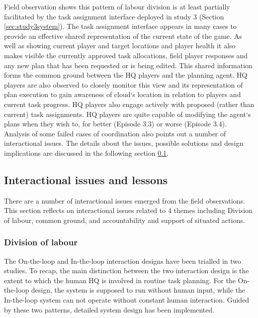 Field observation shows this pattern of labour division is at least partially facilitated by the task assignment interface deployed in study 3 (Section \ref{sec:study3system}). The task assignment interface appears in many cases to provide an effective shared representation of the current state of the game. As well as showing current player and target locations and player health it also makes visible the currently approved task allocations, field player responses and any new plan that has been requested or is being edited. This shared information forms the common ground between the HQ players and the planning agent. HQ players are also observed to closely monitor this view and its representation of plan execution to gain awareness of cloud`s location in relation to players and current task progress. HQ players also engage actively with proposed (rather than current) task assignments. HQ players are quite capable of modifying the agent`s plans when they wish to, for better (Episode 3.3) or worse (Episode 3.4).\\

Analysis of some failed cases of coordination also points out a number of interactional issues. The details about the issues, possible solutions and design implications are discussed in the following section \ref{sec:conclusionIssue}. \\


\subsection{Interactional issues and lessons}\label{sec:conclusionIssue}
There are a number of interactional issues emerged from the field observations. This section reflects on interactional issues related to 4 themes including Division of labour, common ground, and accountability and support of situated actions.

\subsubsection{Division of labour}\label{sec:conclusionHH}
The On-the-loop and In-the-loop interaction designs have been trialled in two studies. To recap, the main distinction between the two interaction design is the extent to which the human HQ is involved in routine task planning. For the On-the-loop design, the system is supposed to run without human input, while the In-the-loop system can not operate without constant human interaction. Guided by these two patterns, detailed system design has been implemented.\\


